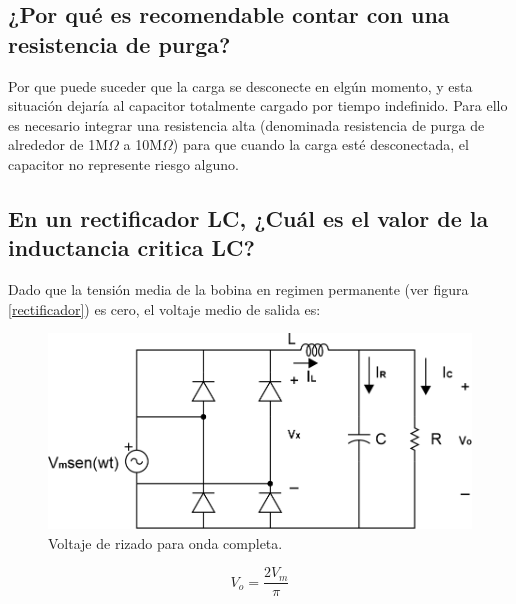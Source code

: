 \documentclass[a4paper]{IEEEtran} %
\begin{document}

\subsection{¿Por qué es recomendable contar con una resistencia de purga?}

Por que puede suceder que la carga se desconecte en elgún momento, y esta situación dejaría al capacitor totalmente cargado por tiempo indefinido. Para ello es necesario integrar una resistencia alta (denominada resistencia de purga de alrededor de 1M$\Omega$ a 10M$\Omega$) para que cuando la carga esté desconectada, el capacitor no represente riesgo alguno.


\subsection{En un rectificador LC, ¿Cuál es el valor de la inductancia critica LC?}

Dado que la tensión media de la bobina en regimen permanente (ver figura \eqref{rectificador}) es cero, el voltaje medio de salida es:

\begin{figure}[h!]
	\centering
	\includegraphics[scale=1]{IMAGENES/rectificador}
	\caption{Voltaje de rizado para onda completa.}
	\label{rectificador}
\end{figure}

\begin{equation}
	V_o = \frac{2 V_m}{\pi}
\end{equation}
\end{document}
